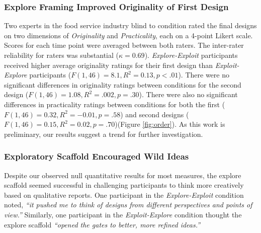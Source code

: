 
\subsubsection{Explore Framing Improved Originality of First Design}
Two experts in the food service industry blind to condition rated the final designs on two dimensions of \textit{Originality} and \textit{Practicality}, each on a 4-point Likert scale. Scores for each time point were averaged between both raters. The inter-rater reliability for raters was substantial (${\kappa}=0.69$). \textit{Explore-Exploit} participants received higher average originality ratings for their first design than \textit{Exploit-Explore} participants ($F(1,46)=8.1, R^2=0.13, p<.01$). There were no significant differences in originality ratings between conditions for the second design ($F(1,46)=1.08, R^2=.002, p=.30$). There were also no significant differences in practicality ratings between conditions for both the first ($F(1,46)=0.32, R^2=-0.01, p=.58$) and second designs ($F(1,46)=0.15, R^2=0.02, p=.70$)(Figure \ref{fig:order}). As this work is preliminary, our results suggest a trend for further investigation.

\subsubsection{Exploratory Scaffold Encouraged Wild Ideas}
Despite our observed null quantitative results for most measures, the explore scaffold seemed successful in challenging participants to think more creatively based on qualitative reports. One participant in the \textit{Explore-Exploit} condition noted, \textit{``it pushed me to think of designs from different perspectives and points of view.''} Similarly, one participant in the \textit{Exploit-Explore} condition thought the explore scaffold \textit{``opened the gates to better, more refined ideas.''} 

